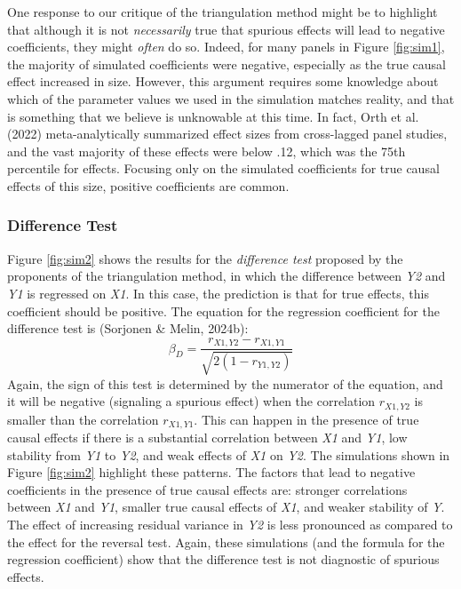\documentclass[
  man,floatsintext]{apa6}
\begin{document}
One response to our critique of the triangulation method might be to highlight that although it is not \emph{necessarily} true that spurious effects will lead to negative coefficients, they might \emph{often} do so. Indeed, for many panels in Figure \ref{fig:sim1}, the majority of simulated coefficients were negative, especially as the true causal effect increased in size. However, this argument requires some knowledge about which of the parameter values we used in the simulation matches reality, and that is something that we believe is unknowable at this time. In fact, Orth et al. (2022) meta-analytically summarized effect sizes from cross-lagged panel studies, and the vast majority of these effects were below .12, which was the 75th percentile for effects. Focusing only on the simulated coefficients for true causal effects of this size, positive coefficients are common.

\subsubsection{Difference Test}\label{difference-test}

Figure \ref{fig:sim2} shows the results for the \emph{difference test} proposed by the proponents of the triangulation method, in which the difference between \emph{Y2} and \emph{Y1} is regressed on \emph{X1}. In this case, the prediction is that for true effects, this coefficient should be positive. The equation for the regression coefficient for the difference test is (Sorjonen \& Melin, 2024b): \[\beta_{D} = \frac{r_{X1,Y2} - r_{X1,Y1}} {\sqrt{2(1 - r_{Y1,Y2})}}\] Again, the sign of this test is determined by the numerator of the equation, and it will be negative (signaling a spurious effect) when the correlation \(r_{X1,Y2}\) is smaller than the correlation \(r_{X1,Y1}\). This can happen in the presence of true causal effects if there is a substantial correlation between \emph{X1} and \emph{Y1}, low stability from \emph{Y1} to \emph{Y2}, and weak effects of \emph{X1} on \emph{Y2}. The simulations shown in Figure \ref{fig:sim2} highlight these patterns. The factors that lead to negative coefficients in the presence of true causal effects are: stronger correlations between \emph{X1} and \emph{Y1}, smaller true causal effects of \emph{X1}, and weaker stability of \emph{Y}. The effect of increasing residual variance in \emph{Y2} is less pronounced as compared to the effect for the reversal test. Again, these simulations (and the formula for the regression coefficient) show that the difference test is not diagnostic of spurious effects.
\end{document}
